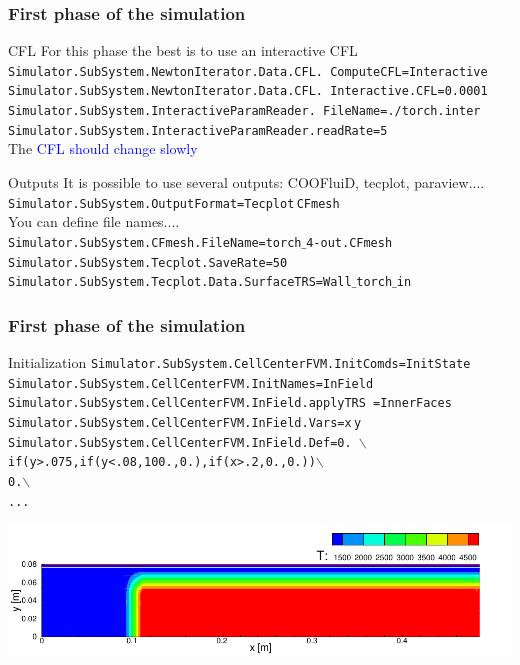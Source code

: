 \documentclass[compress,10pt]{beamer}
\begin{document}
\begin{frame}
\frametitle{First phase of the simulation}
\vspace*{-0.1cm}
  \begin{block}{CFL}
   For this phase the best is to use an interactive CFL
\texttt{\small{Simulator.SubSystem.NewtonIterator.Data.CFL.
\hspace*{6cm} ComputeCFL=Interactive}}
\texttt{\small{Simulator.SubSystem.NewtonIterator.Data.CFL.
\hspace*{6cm} Interactive.CFL=0.0001}}
\texttt{\small{Simulator.SubSystem.InteractiveParamReader.
\hspace*{6cm} FileName=./torch.inter}}
\texttt{\small{Simulator.SubSystem.InteractiveParamReader.readRate=5}}\\
The \textcolor{blue}{CFL should change slowly}
  \end{block}
\vspace*{-0.1cm}
  \begin{block}{Outputs}
It is possible to use several outputs: COOFluiD, tecplot, paraview....
\texttt{\small{Simulator.SubSystem.OutputFormat=Tecplot$\,$CFmesh}}\\
You can define file names....\\
\texttt{\small{Simulator.SubSystem.CFmesh.FileName=torch$\_$4-out.CFmesh}}\\
\texttt{\small{Simulator.SubSystem.Tecplot.SaveRate=50}}\\
\texttt{\small{Simulator.SubSystem.Tecplot.Data.SurfaceTRS=Wall$\_$torch$\_$in}}\\
  \end{block}
 \end{frame}
\begin{frame}
\frametitle{First phase of the simulation}
\begin{block}{Initialization}
 \texttt{\small{Simulator.SubSystem.CellCenterFVM.InitComds=InitState}}
 \texttt{\small{Simulator.SubSystem.CellCenterFVM.InitNames=InField}}
 \texttt{\small{Simulator.SubSystem.CellCenterFVM.InField.applyTRS
\hspace*{6cm}=InnerFaces}}
 \texttt{\small{Simulator.SubSystem.CellCenterFVM.InField.Vars=x$\,$y}}
 \texttt{\small{Simulator.SubSystem.CellCenterFVM.InField.Def=0. $\backslash$ \\
                                               \hspace*{2cm} if(y>.075,if(y<.08,100.,0.),if(x>.2,0.,0.))$\backslash$ \\
                                               \hspace*{5cm} 0.$\backslash$ \\
						\hspace*{5cm} ...}}
\end{block}
 \includegraphics[width=\textwidth]{torch_T_initial.pdf}
\end{frame}
\end{document}
